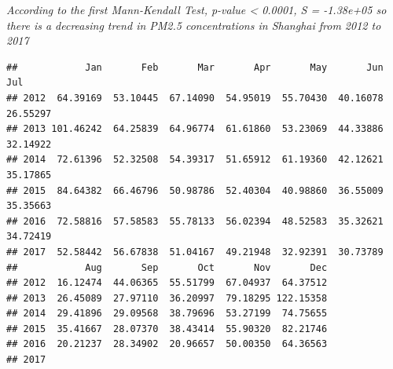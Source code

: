 \documentclass[12pt,]{article}
\newenvironment{Shaded}{\begin{snugshade}}{\end{snugshade}}
\newcommand{\KeywordTok}[1]{\textcolor[rgb]{0.13,0.29,0.53}{\textbf{#1}}}
\newcommand{\DataTypeTok}[1]{\textcolor[rgb]{0.13,0.29,0.53}{#1}}
\newcommand{\DecValTok}[1]{\textcolor[rgb]{0.00,0.00,0.81}{#1}}
\newcommand{\StringTok}[1]{\textcolor[rgb]{0.31,0.60,0.02}{#1}}
\newcommand{\CommentTok}[1]{\textcolor[rgb]{0.56,0.35,0.01}{\textit{#1}}}
\newcommand{\OperatorTok}[1]{\textcolor[rgb]{0.81,0.36,0.00}{\textbf{#1}}}
\newcommand{\NormalTok}[1]{#1}
\begin{document}
\emph{According to the first Mann-Kendall Test, p-value \textless{}
0.0001, S = -1.38e+05 so there is a decreasing trend in PM2.5
concentrations in Shanghai from 2012 to 2017}

\begin{Shaded}
\end{Shaded}

\begin{verbatim}
##            Jan       Feb       Mar       Apr       May       Jun       Jul
## 2012  64.39169  53.10445  67.14090  54.95019  55.70430  40.16078  26.55297
## 2013 101.46242  64.25839  64.96774  61.61860  53.23069  44.33886  32.14922
## 2014  72.61396  52.32508  54.39317  51.65912  61.19360  42.12621  35.17865
## 2015  84.64382  66.46796  50.98786  52.40304  40.98860  36.55009  35.35663
## 2016  72.58816  57.58583  55.78133  56.02394  48.52583  35.32621  34.72419
## 2017  52.58442  56.67838  51.04167  49.21948  32.92391  30.73789          
##            Aug       Sep       Oct       Nov       Dec
## 2012  16.12474  44.06365  55.51799  67.04937  64.37512
## 2013  26.45089  27.97110  36.20997  79.18295 122.15358
## 2014  29.41896  29.09568  38.79696  53.27199  74.75655
## 2015  35.41667  28.07370  38.43414  55.90320  82.21746
## 2016  20.21237  28.34902  20.96657  50.00350  64.36563
## 2017
\end{verbatim}
\end{document}
